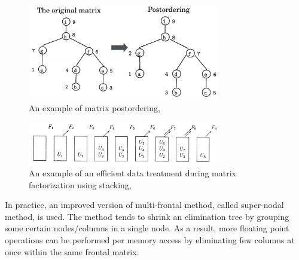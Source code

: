

\figpointer{\ref{fig:mm-matrix-postordering}}
\begin{figure}[htpb]
  \centering
  \includegraphics[width=0.75\textwidth]{figures/chapter-2/elimination-tree-mm-postordering.png}
\caption{An example of matrix postordering, \cite{mult-frontal-original:2}}
\label{fig:mm-matrix-postordering}
\end{figure}


\figpointer{\ref{fig:mm-contrib-matrix-manipulation}}
\begin{figure}[htpb]
  \centering
  \includegraphics[width=0.75\textwidth]{figures/chapter-2/mm-contrib-matrix-manipulation.png}
\caption{An example of an efficient data treatment during matrix factorization using stacking, \cite{mult-frontal-original:2}}
\label{fig:mm-contrib-matrix-manipulation}
\end{figure}


In practice, an improved version of multi-frontal method, called super-nodal method, is used. The method tends to shrink an elimination tree by grouping some certain nodes/columns in a single node. As a result, more floating point operations can be performed per memory access by eliminating few columns at once within the same frontal matrix.\\






